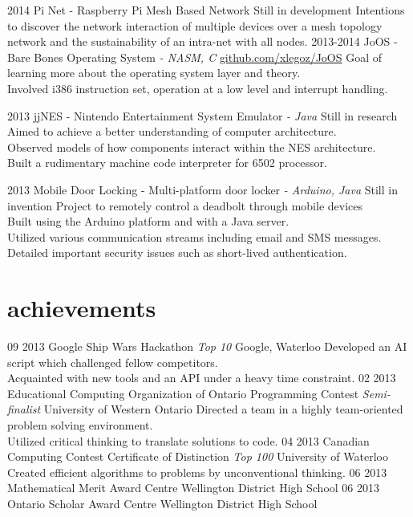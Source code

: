 \documentclass[]{friggeri-cv}
\begin{document}
\begin{entrylist}
  \entry
  	{2014}
  	{Pi Net \textsf{- Raspberry Pi Mesh Based Network}}
  	{Still in development}
  	{Intentions to discover the network interaction of multiple devices over a mesh topology network and the sustainability of an intra-net with all nodes.}
  \entry
    {2013-2014}
    {JoOS \textsf{- Bare Bones Operating System \em{- NASM, C}}}
    {\href{http://github.com/xlegoz/JoOS}{github.com/xlegoz/JoOS}}
    {Goal of learning more about the operating system layer and theory. \\
    Involved i386 instruction set, operation at a low level and interrupt handling.}

 
  \entry
  	{2013}
  	{jjNES \textsf{- Nintendo Entertainment System Emulator \em{- Java}}}
  	{Still in research}
  	{Aimed to achieve a better understanding of computer architecture. \\
  	Observed models of how components interact within the NES architecture. \\
  	Built a rudimentary machine code interpreter for 6502 processor.}
  	 
 
  \entry
  	{2013}
  	{Mobile Door Locking \textsf{- Multi-platform door locker \em{- Arduino, Java}}}
  	{Still in invention}
  	{Project to remotely control a deadbolt through mobile devices \\
  	Built using the Arduino platform and with a Java server. \\
  	Utilized various communication streams including email and SMS messages. \\
  	Detailed important security issues such as short-lived authentication.}
\end{entrylist}



\section{achievements}

\begin{entrylist}
  \entry
  	{09 2013}
  	{Google Ship Wars Hackathon \textsf{\em{Top 10}}}
  	{Google, Waterloo}
  	{Developed an AI script which challenged fellow competitors. \\
  	 Acquainted with new tools and an API under a heavy time constraint.}
  \entry
  	{02 2013}
  	{Educational Computing Organization of Ontario Programming Contest \textsf{\em{Semi-finalist}}}
  	{University of Western Ontario}
  	{Directed a team in a highly team-oriented problem solving environment. \\
  	 Utilized critical thinking to translate solutions to code.}
  \entry
	{04 2013}  	
  	{Canadian Computing Contest Certificate of Distinction \textsf{\em{Top 100}}}
  	{University of Waterloo}
  	{Created efficient algorithms to problems by unconventional thinking.}
  \entry
  	{06 2013}
  	{Mathematical Merit Award}
  	{Centre Wellington District High School}
  	{}
  \entry
  	{06 2013}
  	{Ontario Scholar Award}
  	{Centre Wellington District High School}
  	{}

\end{entrylist}
\end{document}
